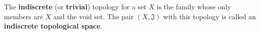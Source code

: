 The \textbf{indiscrete} (or \textbf{trivial}) topology for a set $X$ is the family whose only members are $X$ and the void set. The pair $(X, \mathfrak{J})$ with this topology is called an \textbf{indiscrete topological space}.
